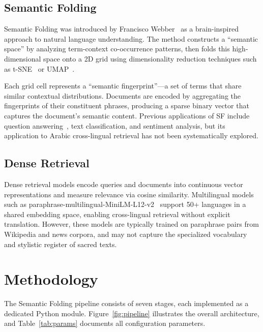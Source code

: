 \documentclass[conference]{IEEEtran}
\begin{document}
\subsection{Semantic Folding}

Semantic Folding was introduced by Francisco
Webber~\cite{webber2018semantic} as a brain-inspired approach to natural
language understanding. The method constructs a ``semantic space'' by
analyzing term-context co-occurrence patterns, then folds this high-
dimensional space onto a 2D grid using dimensionality reduction
techniques such as t-SNE~\cite{maaten2008tsne} or
UMAP~\cite{mcinnes2018umap}.

Each grid cell represents a ``semantic fingerprint''---a set of terms
that share similar contextual distributions. Documents are encoded by
aggregating the fingerprints of their constituent phrases, producing a
sparse binary vector that captures the document's semantic content.
Previous applications of SF include question
answering~\cite{widis2006semantic}, text classification, and sentiment
analysis, but its application to Arabic cross-lingual retrieval has not
been systematically explored.

\subsection{Dense Retrieval}

Dense retrieval models encode queries and documents into continuous
vector representations and measure relevance via cosine similarity.
Multilingual models such as
paraphrase-multilingual-MiniLM-L12-v2~\cite{reimers2019sentence}
support 50+ languages in a shared embedding space, enabling cross-lingual
retrieval without explicit translation. However, these models are
typically trained on paraphrase pairs from Wikipedia and news corpora,
and may not capture the specialized vocabulary and stylistic register
of sacred texts.

\section{Methodology}

The Semantic Folding pipeline consists of seven stages, each implemented
as a dedicated Python module. Figure~\ref{fig:pipeline} illustrates the
overall architecture, and Table~\ref{tab:params} documents all
configuration parameters.
\end{document}
